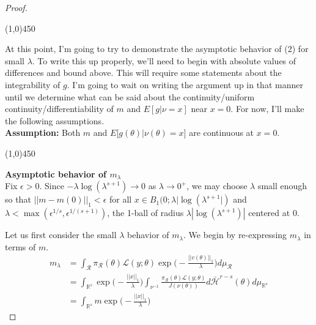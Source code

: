 \documentclass[10pt,fleqn]{article}
\DeclareMathOperator{\1}{\mathbbm{1}}
\begin{document}
{\begin{proof}
\begin{center}\line(1,0){450}\end{center}

At this point, I'm going to try to demonstrate the asymptotic behavior of (2) for small $\lambda.$ To write this up properly, we'll need to begin with absolute values of differences and bound above. This will require some statements about the integrability of $g$. I'm going to wait on writing the argument up in that manner until we determine what can be said about the continuity/uniform continuity/differentiability of $m$ and $E[g|\nu=x]$ near $x=0.$ For now, I'll make the following assumptions.\\

\noindent\textbf{Assumption:} Both $m$ and $E\big[g(\theta)|\nu(\theta)=x\big]$ are continuous at $x=0.$

\begin{center}\line(1,0){450}\end{center}
\vspace{0.5cm}
\noindent \textbf{Asymptotic behavior of $m_\lambda$} \\

\noindent Fix $\epsilon >0$. Since $-\lambda\log(\lambda^{s+1}) \to 0$ as $\lambda\to 0^+$, we may choose $\lambda$ small enough so that $||m-m(0)||_1 < \epsilon$ for all $x\in B_1(0;\lambda|\log(\lambda^{s+1}|)$ and $\lambda < \max(\epsilon^{1/s},\epsilon^{1/(s+1)})$, the 1-ball of radius $\lambda|\log(\lambda^{s+1})|$ centered at $0.$ 

Let us first consider the small $\lambda$ behavior of $m_\lambda.$ We begin by re-expressing $m_\lambda$ in terms of $m.$
\begin{align*}
m_\lambda &= \int_\mathcal{R} \pi_\mathcal{R}(\theta) \mathcal{L}(y;\theta) \exp\bigg(-\frac{||v(\theta)||_1}{\lambda}\bigg) d\mu_\mathcal{R} \\
&= \int_{\mathbb{R}^s} \exp\bigg(-\frac{||x||_1}{\lambda}\bigg) \int_{\nu^{-1}} \frac{\pi_\mathcal{R}(\theta) \mathcal{L}(y;\theta)}{J(\nu(\theta))} d\bar{\mathcal{H}}^{r-s}(\theta) d\mu_{\mathbb{R}^s}  \\
&=\int_{\mathbb{R}^s}m \exp\bigg(-\frac{||x||_1}{\lambda}\bigg)
\end{align*}


\end{proof}}
\end{document}
